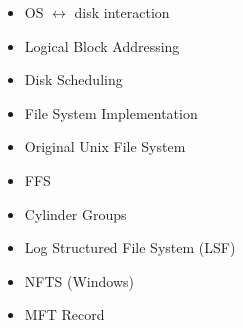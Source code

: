 \documentclass[12pt]{article}
\begin{document}
\begin{itemize}
    \item OS $\leftrightarrow$ disk interaction
    \item Logical Block Addressing
    \item Disk Scheduling
    \item File System Implementation
    \item Original Unix File System
    \item FFS
    \item Cylinder Groups
    \item Log Structured File System (LSF)
    \item NFTS (Windows)
    \item MFT Record
\end{itemize}
\end{document}
